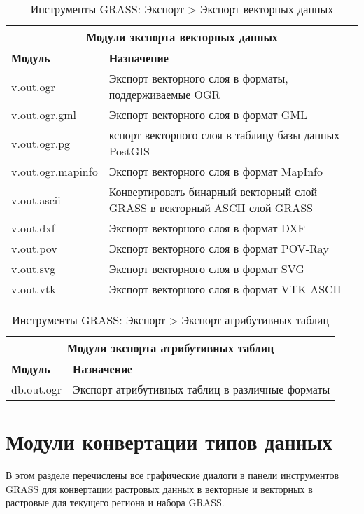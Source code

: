 {\renewcommand{\arraystretch}{0.7}
\begin{table}[H]
\centering
 \begin{tabular}{|p{4cm}|p{10cm}|}
  \hline \multicolumn{2}{|c|}{\textbf{Модули экспорта векторных данных}} \\
  \hline \textbf{Модуль} & \textbf{Назначение} \\
  \hline v.out.ogr & Экспорт векторного слоя в форматы, поддерживаемые OGR \\
  \hline v.out.ogr.gml & Экспорт векторного слоя в формат GML \\
  \hline v.out.ogr.pg & кспорт векторного слоя в таблицу базы данных
  PostGIS \\
  \hline v.out.ogr.mapinfo & Экспорт векторного слоя в формат MapInfo \\
  \hline v.out.ascii & Конвертировать бинарный векторный слой GRASS в
  векторный ASCII слой GRASS \\
  \hline v.out.dxf & Экспорт векторного слоя в формат DXF \\
  \hline v.out.pov & Экспорт векторного слоя в формат POV-Ray \\
  \hline v.out.svg & Экспорт векторного слоя в формат SVG \\
  \hline v.out.vtk & Экспорт векторного слоя в формат VTK-ASCII \\
\hline
\end{tabular}
\caption{Инструменты GRASS: Экспорт > Экспорт векторных данных}
\end{table}}

{\renewcommand{\arraystretch}{0.7}
\begin{table}[H]
\centering
 \begin{tabular}{|p{4cm}|p{10cm}|}
  \hline \multicolumn{2}{|c|}{\textbf{Модули экспорта атрибутивных таблиц}} \\
  \hline \textbf{Модуль} & \textbf{Назначение} \\
  \hline db.out.ogr & Экспорт атрибутивных таблиц в различные форматы \\
\hline
\end{tabular}
\caption{Инструменты GRASS: Экспорт > Экспорт атрибутивных таблиц}
\end{table}}


\section{Модули конвертации типов данных}

В этом разделе перечислены все графические диалоги в панели инструментов
GRASS для конвертации растровых данных в векторные и векторных в растровые
для текущего региона и набора GRASS.

